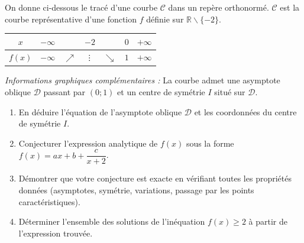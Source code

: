 \documentclass[11pt]{article}
\def\setminus{\mathbin{\backslash}}\let\smallsetminus\setminus
\def\vdots{\mathord{\vbox{\baselineskip3.2pt\lineskiplimit0pt\kern4pt\hbox{.}\hbox{.}\hbox{.}}}}%
\begin{document}
\begin{exercice}
On donne ci-dessous le tracé d'une courbe $\mathcal{C}$ dans un repère orthonormé. $\mathcal{C}$ est la courbe représentative d'une fonction $f$ définie sur $\mathbb{R}\setminus\{-2\}$.
\begin{center}
\begin{tabular}{|c|c|c|c|c|c|c|}
\hline
$x$ & $-\infty$ &  & $-2$ &  & $0$ & $+\infty$ \\ \hline
$f(x)$ & $-\infty$ & $\nearrow$ & $\vdots$ & $\searrow$ & $1$ & $+\infty$ \\ \hline
\end{tabular}
\end{center}
\textit{Informations graphiques complémentaires :} La courbe admet une asymptote oblique $\mathcal{D}$ passant par $(0;1)$ et un centre de symétrie $I$ situé sur $\mathcal{D}$.
\begin{enumerate}
    \item En déduire l'équation de l'asymptote oblique $\mathcal{D}$ et les coordonnées du centre de symétrie $I$.
    \item Conjecturer l'expression analytique de $f(x)$ sous la forme $f(x)=ax+b+\dfrac{c}{x+2}$.
    \item Démontrer que votre conjecture est exacte en vérifiant toutes les propriétés données (asymptotes, symétrie, variations, passage par les points caractéristiques).
    \item Déterminer l'ensemble des solutions de l'inéquation $f(x)\geq 2$ à partir de l'expression trouvée.
\end{enumerate}
\end{exercice}
\end{document}
